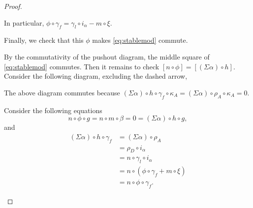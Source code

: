 \begin{proof}
\begin{enumerate}[label={(\bfseries TR\arabic*)}]
{\begin{center}
            \end{center}
            In particular, \( \phi \circ \gamma_f = \gamma_{l} \circ i_{\alpha} - m \circ \xi \).

            Finally, we check that this \( \phi \) makes \autoref{eq:stablemod} commute.

            By the commutativity of the pushout diagram, the middle square of \autoref{eq:stablemod} commutes. Then it remains to check \( [n \circ \phi] = [(\Sigma \alpha) \circ h] \). Consider the following diagram, excluding the dashed arrow,
            \begin{center}
            \end{center}
            The above diagram commutes because \( (\Sigma \alpha) \circ h \circ \gamma_f \circ \kappa_A = (\Sigma \alpha) \circ \rho_A \circ \kappa_A = 0 \).

            Consider the following equations
            \[
                n \circ \phi \circ g = n \circ m \circ \beta = 0 = (\Sigma \alpha) \circ h \circ g,
            \]
            and
            \begin{align*}
                (\Sigma \alpha) \circ h \circ \gamma_f &= (\Sigma \alpha) \circ \rho_A \\
                &= \rho_{D} \circ i_{\alpha} \\
                &= n \circ \gamma_{l} \circ i_{\alpha} \\
                &= n \circ (\phi \circ \gamma_f + m \circ \xi) \\
                &= n \circ \phi \circ \gamma_f.
            \end{align*}
                
}
\end{enumerate}
\end{proof}
